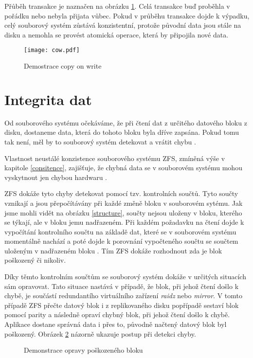 Přůběh transakce je naznačen na obrázku \ref{cow}. Celá transakce buď proběhla v pořádku nebo nebyla přijata vůbec. Pokud v průběhu transakce dojde k výpadku, celý souborový systém zůstává konzistentní, protože původní data jsou stále na disku a nemohla se provést atomická operace, která by připojila nové data.
\begin{figure}[h]
    \caption{Demostrace copy on write}
    \label{cow}
    \texttt{[image: cow.pdf]}
\end{figure}
\section{Integrita dat}
\label{checksum}
Od souborového systému očekáváme, že při čtení dat z určitého datového bloku z disku, dostaneme data, která do tohoto bloku byla dříve zapsána. Pokud tomu tak není, měl by to souborový systém detekovat a vrátit chybu \cite{integrity1}.

Vlastnost neustálé konzistence souborového systému ZFS, zmíněná výše v kapitole \ref{consitence}, zajišťuje, že chybná data se v souborovém systému mohou vyskytnout jen chybou hardwaru \cite{integrity2}.

ZFS dokáže tyto chyby detekovat pomocí tzv. kontrolních součtů. Tyto součty vznikají a jsou přepočítávány při každé změně bloku v souborovém sytému. Jak jsme mohli vidět na obrázku \ref{structure}, součty nejsou uloženy v bloku, kterého se týkají, ale v bloku jemu nadřazeném. Při každém požadavku na čtení dojde k vypočítání kontrolního součtu na základě dat, které se v souborovém systému momentálně nachází a poté dojde k porovnání vypočteného součtu se součtem uloženým v nadřazeném bloku \cite{integrity1}. Tím ZFS dokáže rozhodnout zda je blok poškozený či nikoliv.

Díky těmto kontrolním součtům se souborový systém dokáže v určitých situacích sám opravovat. Tato situace nastává v případě, že blok, při jehož čtení došlo k chybě, je součástí redundantího virtuálního zařízení \emph{raidz} nebo \emph{mirror}. V tomto případě ZFS přečte datový blok i z replikovaného disku popřípadě sestaví blok pomocí parity a následně opraví chybný blok, při jehož čtení došlo k chybě. Aplikace dostane správná data i přes to, původně načtený datový blok byl poškozený. Obrázek \ref{selfhealing} názorně ukazuje postup při detekci chyby.
\begin{figure}[h]
    \caption{Demonstrace opravy poškozeného bloku}
    \label{selfhealing}
\end{figure}

